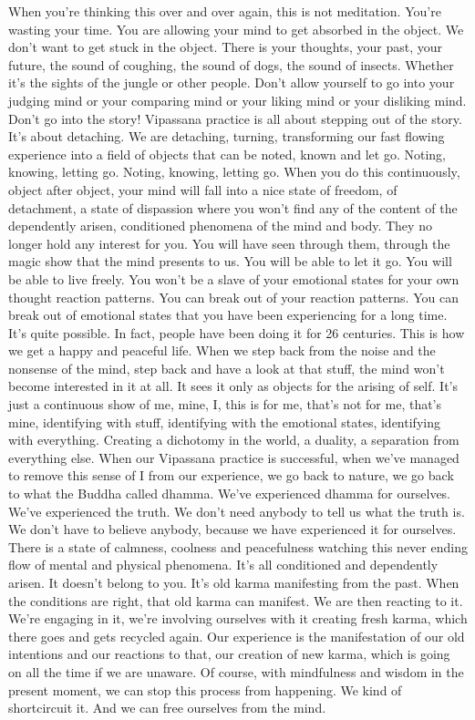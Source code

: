 \documentclass[letterpaper,10pt,english]{sphinxmanual}
\begin{document}
\sphinxAtStartPar
When you’re thinking this over and over again, this is not meditation.
You’re  wasting  your  time. You  are  allowing  your  mind  to  get  absorbed  in
the object. We don’t want to get stuck in the object. There is your thoughts,
your past, your future, the sound of coughing, the sound of dogs, the sound
of insects. Whether it’s the sights of the jungle or other people. Don’t allow
yourself to go into your judging mind or your comparing mind or your liking
mind or your disliking mind. Don’t go into the story! Vipassana practice is
all about stepping out of the story. It’s about detaching. We are detaching,
turning, transforming our fast flowing experience into a field of objects that
can be noted, known and let go. Noting, knowing, letting go. Noting, knowing, letting go. When you do this continuously, object after object, your mind
  will  fall  into  a  nice  state  of  freedom,  of  detachment,  a  state  of  dispassion
where you won’t find any of the content of the dependently arisen, conditioned phenomena of the mind and body. They no longer hold any interest
for you. You will have seen through them, through the magic show that the
mind presents to us. You will be able to let it go. You will be able to live
freely. You won’t be a slave of your emotional states for your own thought
reaction patterns. You can break out of your reaction patterns. You can break
out of emotional states that you have been experiencing for a long time. It’s
quite  possible.  In  fact,  people  have  been  doing  it  for  26  centuries. This  is
how we get a happy and peaceful life. When we step back from the noise and
the nonsense of the mind, step back and have a look at that stuff, the mind
won’t become interested in it at all. It sees it only as objects for the arising
of self. It’s just a continuous show of me, mine, I, this is for me, that’s not for
me, that’s mine, identifying with stuff, identifying with the emotional states,
identifying with everything. Creating a dichotomy in the world, a duality, a
separation from everything else. When our Vipassana practice is successful,
when  we’ve  managed  to  remove  this  sense  of  I  from  our  experience,  we
go back to nature, we go back to what the Buddha called dhamma. We’ve
experienced dhamma for ourselves. We’ve experienced the truth. We don’t
need anybody to tell us what the truth is. We don’t have to believe anybody,
because we have experienced it for ourselves. There is a state of calmness,
coolness  and  peacefulness  watching  this  never  ending  flow  of  mental  and
physical phenomena. It’s all conditioned and dependently arisen. It doesn’t
belong  to  you.  It’s  old  karma  manifesting  from  the  past. When  the  conditions are right, that old karma can manifest. We are then reacting to it. We’re
engaging in it, we’re involving ourselves with it creating fresh karma, which
there goes and gets recycled again. Our experience is the manifestation of
our old intentions and our reactions to that, our creation of new karma, which
is going on all the time if we are unaware. Of course, with mindfulness and
wisdom in the present moment, we can stop this process from happening. We
kind of short\sphinxhyphen{}circuit it. And we can free ourselves from the mind.
\end{document}
